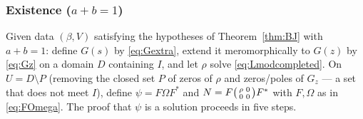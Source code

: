 \documentclass[11pt,a4paper]{article}
\theoremstyle{plain}
\theoremstyle{definition}
\theoremstyle{remark}
\begin{document}
\subsubsection{Existence ($a+b=1$)}\label{ssec:exist}

Given data $(\beta,V)$ satisfying the hypotheses of Theorem~\ref{thm:BJ}
with $a+b=1$: define $G(s)$ by \eqref{eq:Gextra}, extend it meromorphically
to $G(z)$ by \eqref{eq:Gz} on a domain $D$
containing $I$, and let $\rho$ solve \eqref{eq:Lmodcompleted}. On
$U=D\setminus P$ (removing the closed set $P$ of zeros of $\rho$ and
zeros/poles of $G_z$ — a set that does not meet $I$), define
$\psi=F\Omega F^*$ and $N=F\begin{psmallmatrix}\rho&0\\0&0\end{psmallmatrix}F^*$
with $F,\Omega$ as in \eqref{eq:FOmega}. The proof that $\psi$ is a
solution proceeds in five steps.
\end{document}
